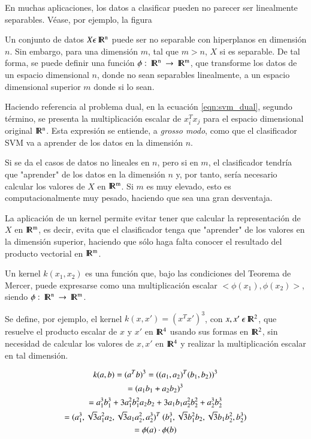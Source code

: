 En muchas aplicaciones, los datos a clasificar pueden no parecer ser linealmente separables. Véase, por ejemplo, la figura %

\imagetest

Un conjunto de datos $X \epsilon\: \rm I\!R^{n}$ puede ser no separable con hiperplanos en dimensión $n$. Sin embargo, para una dimensión $m$, tal que $m > n$, $X$ si es separable. De tal forma, se puede definir una función $\phi:\: \rm I\!R^{n}\: \rightarrow\: \rm I\!R^{m}$, que transforme los datos de un espacio dimensional $n$, donde no sean separables linealmente, a un espacio dimensional superior $m$ donde si lo sean.

Haciendo referencia al problema dual, en la ecuación \ref{eqn:svm_dual}, segundo término, se presenta la multiplicación escalar de $x_{i}^{T}x_{j}$ para el espacio dimensional original $\rm I\!R^{n}$. Esta expresión se entiende, a \textit{grosso modo}, como que el clasificador SVM va a aprender de los datos en la dimensión $n$. 

Si se da el casos de datos no lineales en $n$, pero si en $m$, el clasificador tendría que "aprender" de los datos en la dimensión $n$ y, por tanto, sería necesario calcular los valores de $X$ en $\rm I\!R^{m}$. Si $m$ es muy elevado, esto es computacionalmente muy pesado, haciendo que sea una gran desventaja.

La aplicación de un kernel permite evitar tener que calcular la representación de $X$ en $\rm I\!R^{m}$, es decir, evita que el clasificador tenga que "aprender" de los valores en la dimensión superior, haciendo que sólo haga falta conocer el resultado del producto vectorial en $\rm I\!R^{m}$.

Un kernel $k(x_{1},x_{2})$ es una función que, bajo las condiciones del Teorema de Mercer, puede expresarse como una multiplicación escalar $<\phi(x_{1}),\phi(x_{2})>$, siendo $\phi:\: \rm I\!R^{n}\: \rightarrow\: \rm I\!R^{m}$.

Se define, por ejemplo, el kernel $k(x,x') = (x^{T}x')^{3}$, con $x,x'\:\epsilon\: \rm I\!R^{2}$, que resuelve el producto escalar de $x$ y $x'$ en $\rm I\!R^{4}$ usando sus formas en $\rm I\!R^{2}$, sin necesidad de calcular los valores de $x,x'$ en $\rm I\!R^{4}$ y realizar la multiplicación escalar en tal dimensión.

\begin{equation}
	\centering
	\begin{gathered}
		k(a,b) = (a^{T}b)^{3}
		= ((a_{1},a_{2})^{T}(b_{1},b_{2}))^{3} \\
		= (a_{1}b_{1}+a_{2}b_{2})^{3} \\
		= a_{1}^{3}b_{1}^{3} + 3a_{1}^{2}b_{1}^{2}a_{2}b_{2} + 3a_{1}b_{1}a_{2}^{2}b_{2}^{2} + a_{2}^{3}b_{2}^{3} \\
		= (a_{1}^{3},\sqrt{3}a_{1}^{2}a_{2},\sqrt{3}a_{1}a_{2}^{2},a_{2}^{3})^{T}\:(b_{1}^{3},\sqrt{3}b_{1}^{2}b_{2},\sqrt{3}b_{1}b_{2}^{2},b_{2}^{3}) \\
		= \phi(a)\cdot\phi(b)		
	\end{gathered}
	\label{eqn:svm_kernel_ejemplo}
\end{equation}


